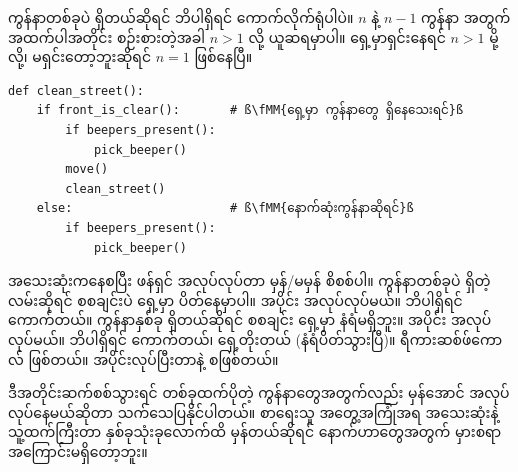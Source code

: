 ကွန်နာတစ်ခုပဲ ရှိတယ်ဆိုရင် ဘိပါရှိရင် ကောက်လိုက်ရုံပါပဲ။ $n$ နဲ့ $n - 1$ ကွန်နာ အတွက် အထက်ပါအတိုင်း စဉ်းစားတဲ့အခါ $n > 1$ လို့ ယူဆရမှာပါ။ ရှေ့မှာရှင်းနေရင် $n > 1$ မို့လို့၊ မရှင်းတော့ဘူးဆိုရင် $n = 1$ ဖြစ်နေပြီ။
%
\setlength{\fboxsep}{0pt}
\begin{verbatim}
def clean_street():
    if front_is_clear():       # ß\fMM{ရှေ့မှာ ကွန်နာတွေ ရှိနေသေးရင်}ß
        if beepers_present():
            pick_beeper()
        move()
        clean_street()
    else:                      # ß\fMM{နောက်ဆုံးကွန်နာဆိုရင်}ß
        if beepers_present():
            pick_beeper() 
\end{verbatim}
အသေးဆုံးကနေစပြီး ဖန်ရှင် အလုပ်လုပ်တာ မှန်/မမှန် စိစစ်ပါ။ ကွန်နာတစ်ခုပဲ ရှိတဲ့လမ်းဆိုရင် စစချင်းပဲ ရှေ့မှာ ပိတ်နေမှာပါ။  အပိုင်း အလုပ်လုပ်မယ်။ ဘိပါရှိရင် ကောက်တယ်။ ကွန်နာနှစ်ခု ရှိတယ်ဆိုရင် စစချင်း ရှေ့မှာ နံရံမရှိဘူး။  အပိုင်း အလုပ်လုပ်မယ်။ ဘိပါရှိရင် ကောက်တယ်၊ ရှေ့တိုးတယ် (နံရံပိတ်သွားပြီ)။  ရီကားဆစ်ဖ်ကောလ် ဖြစ်တယ်။  အပိုင်းလုပ်ပြီးတာနဲ့  စဖြစ်တယ်။

ဒီအတိုင်းဆက်စစ်သွားရင် တစ်ခုထက်ပိုတဲ့ ကွန်နာတွေအတွက်လည်း မှန်အောင် အလုပ်လုပ်နေမယ်ဆိုတာ သက်သေပြနိုင်ပါတယ်။ စာရေးသူ အတွေ့အကြုံအရ အသေးဆုံးနဲ့ သူ့ထက်ကြီးတာ နှစ်ခုသုံးခုလောက်ထိ မှန်တယ်ဆိုရင် နောက်ဟာတွေအတွက် မှားစရာ အကြောင်းမရှိတော့ဘူး။

